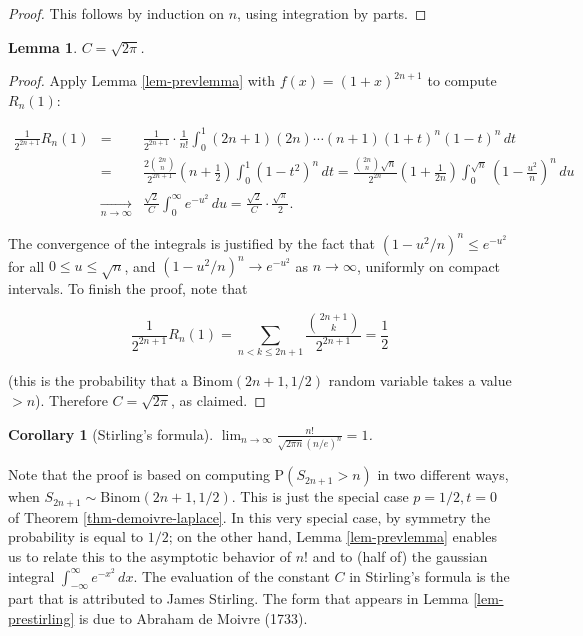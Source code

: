 \documentclass[11pt]{report}
\theoremstyle{plain}
\newtheorem{lem}[thm]{Lemma}
\newtheorem{cor}[thm]{Corollary}
\theoremstyle{definition}
\begin{document}
\begin{proof}
This follows by induction on $n$, using integration
by parts.
\end{proof}

\begin{lem}
$C=\sqrt{2\pi}$.
\end{lem}

\begin{proof}
Apply Lemma \ref{lem-prevlemma} with $f(x) = (1+x)^{2n+1}$
to compute $R_n(1)$:

\begin{eqnarray*}
\frac{1}{2^{2n+1}} R_n(1) &=& \frac{1}{2^{2n+1}} \cdot \frac{1}{n!}\int_0^1 (2n+1)(2n)\cdots (n+1)(1+t)^n (1-t)^n
\,dt \\ &=& \frac{2 \binom{2n}{n}}{2^{2n+1}} (n+\frac12) \int_0^1 (1-t^2)^n\, dt = \frac{ \binom{2n}{n} \sqrt{n}}{2^{2n}}
(1+\frac{1}{2n}) \int_0^{\sqrt{n}} \left(1-\frac{u^2}{n}\right)^n\,du \\
&\xrightarrow[n\to\infty]{} & \frac{\sqrt{2}}{C} \int_0^\infty e^{-u^2}\,du = \frac{\sqrt{2}}{C} \cdot \frac{\sqrt{\pi}}{2}.
\end{eqnarray*}

The convergence of the integrals is justified by the
fact that $(1-u^2/n)^n \le e^{-u^2}$ for all
$0\le u\le \sqrt{n}$, and $(1-u^2/n)^n \to e^{-u^2}$
as $n\to\infty$, uniformly on compact intervals. To
finish the proof, note that

\[
\frac{1}{2^{2n+1}} R_n(1) = \sum_{n<k\le 2n+1} \frac{\binom{2n+1}{k}}{2^{2n+1}} = \frac12
\]

(this is the probability that a
$\textrm{Binom}(2n+1,1/2)$ random variable takes a
value $> n$). Therefore $C=\sqrt{2\pi}$, as claimed.
\end{proof}

\begin{cor}[Stirling's formula]
$\lim_{n\to\infty} \frac{n!}{\sqrt{2\pi n}
(n/e)^n}=1$.
\end{cor}

Note that the proof is based on computing
$\mathrm{P}(S_{2n+1} > n)$ in two different ways,
when $S_{2n+1}\sim \textrm{Binom}(2n+1,1/2)$. This is
just the special case $p=1/2, t=0$ of Theorem
\ref{thm-demoivre-laplace}. In this very special case, by
symmetry the probability is equal to $1/2$; on the
other hand, Lemma \ref{lem-prevlemma} enables us to relate
this to the asymptotic behavior of $n!$ and to (half
of) the gaussian integral
$\int_{-\infty}^\infty e^{-x^2}\,dx$. The evaluation
of the constant $C$ in Stirling's formula is the part
that is attributed to James Stirling. The form that
appears in Lemma \ref{lem-prestirling} is due to Abraham
de Moivre (1733).
\end{document}
